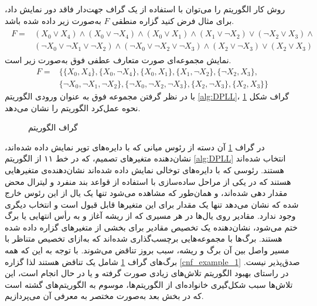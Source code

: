 روش کار الگوریتم 
را می‌توان با استفاده از یک گراف جهت‌دار فاقد دور  نمایش داد، برای مثال فرض کنید گزاره منطقی 
$F$
به‌صورت زیر داده شده باشد. 
\begin{align}
\label{cnf_example_1}
\begin{split}
F =& (X_{0}\vee X_{4})\wedge (X_{0}\vee \neg X_{4})\wedge (X_{0}\vee X_{1})\wedge (X_{1}\vee \neg X_{2})\vee (\neg X_{2}\vee X_{3})\wedge \\
&(\neg X_{0}\vee \neg X_{1}\vee \neg X_{2})\wedge (\neg X_{0}\vee \neg X_{2}\vee \neg X_{3})\wedge (X_{2}\vee \neg X_{3})\vee (X_{2}\vee X_{3})
\end{split}
\end{align}
نمایش مجموعه‌ای  صورت متعارف عطفی فوق به‌صورت زیر است.
\begin{align*}
F =&\{\{X_{0}, X_{4}\}, \{X_{0}, \neg X_{4}\}, \{X_{0}, X_{1}\}, \{X_{1}, \neg X_{2}\}, \{\neg X_{2}, X_{3}\}, \\
&\{\neg X_{0}, \neg X_{1}, \neg X_{2}\}, \{\neg X_{0}, \neg X_{2}, \neg X_{3}\}, \{X_{2}, \neg X_{3}\}, \{X_{2}, X_{3}\}\}
\end{align*}
با در نظر گرفتن مجموعه فوق به عنوان ورودی الگوریتم 
\ref{alg:DPLL}، 
گراف شکل 
\ref{fig:DPLL_Graph}
نحوه عمل‌کرد الگوریتم را نشان می‌دهد. 
\begin{figure}
	\centering

\caption{گراف الگوریتم
}
\label{fig:DPLL_Graph}
\end{figure}
در گراف 
\ref{fig:DPLL_Graph}
آن دسته از  رئوس میانی که  با دایره‌های توپر  نمایش داده شده‌اند، نشان‌دهنده متغیرهای تصمیم،  که در خط ۱۱ از الگوریتم 
 \ref{alg:DPLL}
  انتخاب شده‌اند هستند.   رئوسی که با دایره‌های توخالی نمایش داده شده‌اند نشان‌دهنده‌ی متغیرهایی هستند که  در یکی از مراحل ساده‌سازی با استفاده از قواعد بند منفرد و لیترال محض مقدار دهی شده‌اند، و همان‌طور که مشاهده می‌شود تنها یک یال از این رئوس خارج شده  که نشان می‌دهد تنها یک مقدار برای این متغیرها قابل قبول است و انتخاب دیگری وجود ندارد.  مقادیر روی یال‌ها در  هر مسیری که از ریشه آغاز و به رأس انتهایی یا برگ ختم می‌شود، نشان‌دهنده یک تخصیص  مقادیر  برای بخشی از متغیرهای گزاره داده شده هستند. برگ‌ها با مجموعه‌هایی برچسب‌گذاری شده‌اند که به‌ازای تخصیص متناظر  با مسیر واصل بین آن برگ و ریشه، سبب بروز تناقض می‌شوند. با توجه به این که همه  برگ‌های گراف 
  \ref{fig:DPLL_Graph}
 شامل یک تناقض هستند لذا گزاره 
  \ref{cnf_example_1}
   صدق‌پذیر نیست.  در راستای بهبود الگوریتم 
   تلاش‌های زیادی صورت گرفته و یا در حال انجام است، این تلاش‌ها سبب شکل‌گیری خانواده‌ای از الگوریتم‌ها، موسوم به الگوریتم‌های 
   گشته است که در بخش بعد به‌صورت مختصر به معرفی آن‌ می‌پردازیم. 
